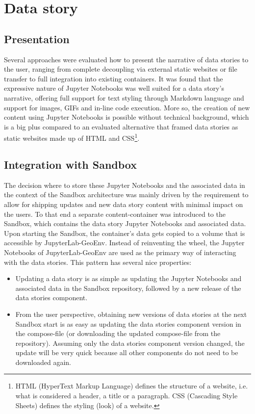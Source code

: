 \documentclass[11pt, a4paper, oneside, parskip=full-]{scrartcl}
\begin{document}
\section{Data story}


\subsection{Presentation}

Several approaches were evaluated how to present the narrative of data stories
to the user, ranging from complete decoupling via external static websites or
file transfer to full integration into existing containers. It was found that
the expressive nature of Jupyter Notebooks was well suited for a data story's
narrative, offering full support for text styling through Markdown language and
support for images, GIFs and in-line code execution. More so, the creation of
new content using Jupyter Notebooks is possible without technical background,
which is a big plus compared to an evaluated alternative that framed data
stories as static websites made up of HTML and CSS\footnote{HTML (HyperText
Markup Language) defines the structure of a website, i.e. what is considered a
header, a title or a paragraph. CSS (Cascading Style Sheets) defines the styling
(look) of a website.}.

\subsection{Integration with Sandbox}

The decision where to store these Jupyter Notebooks and the associated data in
the context of the Sandbox architecture was mainly driven by the requirement to
allow for shipping updates and new data story content with minimal impact on the
users. To that end a separate content-container was introduced to the Sandbox,
which contains the data story Jupyter Notebooks and associated data. Upon
starting the Sandbox, the container's data gets copied to a volume that is
accessible by JupyterLab-GeoEnv. Instead of reinventing the wheel, the Jupyter
Notebooks of JupyterLab-GeoEnv are used as the primary way of interacting with
the data stories. This pattern has several nice properties:
\begin{itemize}
  \item Updating a data story is as simple as updating the Jupyter Notebooks and
  associated data in the Sandbox repository, followed by a new release of the
  data stories component.
  \item From the user perspective, obtaining new versions of data stories at the
  next Sandbox start is as easy as updating the data stories component version
  in the compose-file (or downloading the updated compose-file from the
  repository). Assuming only the data stories component version changed, the
  update will be very quick because all other components do not need to be
  downloaded again.
\end{itemize}
\end{document}
